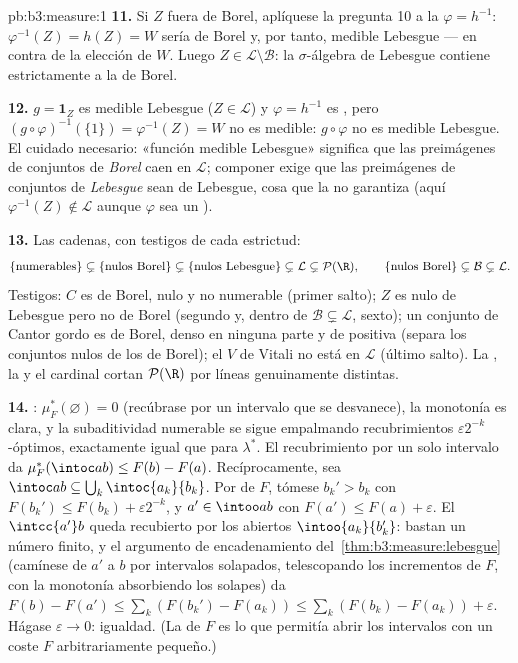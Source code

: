 \begin{solution}{pb:b3:measure:1}
\textbf{11.} Si $Z$ fuera de Borel, aplíquese la pregunta 10 a la
 $\varphi = h^{-1}$:
$\varphi^{-1}(Z) = h(Z) = W$ sería de Borel y, por tanto, medible
Lebesgue --- en contra de la elección de $W$. Luego
$Z \in \mathcal L \setminus \mathcal B$: la $\sigma$-álgebra de Lebesgue
contiene estrictamente a la de Borel.

\textbf{12.} $g = \mathbf 1_Z$ es medible Lebesgue ($Z \in
\mathcal L$) y $\varphi = h^{-1}$ es
, pero
$(g\circ\varphi)^{-1}(\{1\}) = \varphi^{-1}(Z) = W$ no es medible:
$g \circ \varphi$ no es medible Lebesgue. El cuidado necesario: «función
medible Lebesgue» significa que las preimágenes de conjuntos de
\emph{Borel} caen en $\mathcal L$; componer exige que las preimágenes de
conjuntos de \emph{Lebesgue} sean de Lebesgue, cosa que la
 no garantiza (aquí
$\varphi^{-1}(Z) \notin
\mathcal L$ aunque $\varphi$ sea un
).

\textbf{13.} Las cadenas, con testigos de cada estrictud:
\[
\{\text{numerables}\} \subsetneq \{\text{nulos Borel}\}
\subsetneq \{\text{nulos Lebesgue}\} \subsetneq \mathcal L
\subsetneq \mathcal P(\R),
\qquad
\{\text{nulos Borel}\} \subsetneq \mathcal B \subsetneq
\mathcal L .
\]
Testigos: $C$ es de Borel, nulo y no numerable (primer salto); $Z$ es
nulo de Lebesgue pero no de Borel (segundo y, dentro de $\mathcal B
\subsetneq \mathcal L$, sexto); un conjunto de Cantor gordo es de Borel,
denso en ninguna parte y de 
positiva (separa los conjuntos nulos de los de Borel); el $V$ de Vitali
no está en $\mathcal L$ (último salto). La
, la
 y el cardinal cortan
$\mathcal P(\R)$ por líneas genuinamente distintas.

\textbf{14.} :
$\mu_F^*(\varnothing) = 0$ (recúbrase por un intervalo que se
desvanece), la monotonía es clara, y la subaditividad numerable se sigue
empalmando recubrimientos $\varepsilon2^{-k}$-óptimos, exactamente igual
que para $\lambda^*$. El recubrimiento por un solo intervalo da
$\mu_F^*(\intoc ab) \leq F(b) - F(a)$. Recíprocamente, sea
$\intoc ab \subseteq \bigcup_k\intoc{a_k}{b_k}$. Por
 de $F$, tómese
$b_k' > b_k$ con $F(b_k') \leq F(b_k) +
\varepsilon2^{-k}$, y $a' \in \intoo ab$ con $F(a') \leq
F(a) + \varepsilon$. El 
$\intcc{a'}b$ queda recubierto por los abiertos $\intoo{a_k}{b_k'}$:
bastan un número finito, y el argumento de encadenamiento
del~\cref{thm:b3:measure:lebesgue} (camínese de $a'$ a $b$ por
intervalos solapados, telescopando los incrementos de $F$, con la
monotonía absorbiendo los solapes) da $F(b)
- F(a') \leq \sum_k(F(b_k') - F(a_k)) \leq \sum_k(F(b_k) -
F(a_k)) + \varepsilon$. Hágase $\varepsilon \to 0$: igualdad. (La
 de $F$ es lo que
permitía abrir los intervalos con un coste $F$ arbitrariamente pequeño.)


\end{solution}
